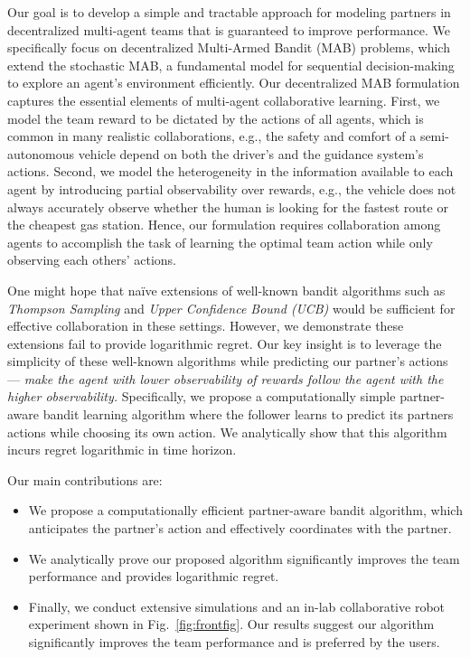\documentclass[letterpaper]{article} %
\theoremstyle{definition}
\begin{document}
Our goal is to develop a simple and tractable approach for modeling partners in decentralized multi-agent teams that is guaranteed to improve performance.
We specifically focus on decentralized Multi-Armed Bandit (MAB) problems, which extend the stochastic MAB, a fundamental model for sequential decision-making to explore an agent's environment efficiently.
Our decentralized MAB formulation captures the essential elements of multi-agent collaborative learning.
First, we model the team reward to be dictated by the actions of all agents, which is common in many realistic collaborations, e.g., the safety and comfort of a semi-autonomous vehicle depend on both the driver's and the guidance system's actions.
Second, we model the heterogeneity in the information available to each agent by introducing partial observability over rewards, e.g., the vehicle does not always accurately observe whether the human is looking for the fastest route or the cheapest gas station.
Hence, our formulation requires collaboration among agents to accomplish the task of learning the optimal team action while only observing each others' actions.

One might hope that na\"ive extensions of well-known bandit algorithms such as \emph{Thompson Sampling} and \emph{Upper Confidence Bound (UCB)} would be sufficient for effective collaboration in these settings. However, we demonstrate these extensions fail to provide logarithmic regret.
Our key insight is to leverage the simplicity of these well-known algorithms while predicting our partner's actions --- \emph{make the agent with lower observability of rewards follow the agent with the higher observability.} Specifically, we propose a computationally simple partner-aware bandit learning algorithm where the follower learns to predict its partners actions while choosing its own action.
We analytically show that this algorithm incurs regret logarithmic in time horizon.


Our main contributions are:
\begin{itemize}[leftmargin=20pt]
    \item We propose a computationally efficient partner-aware bandit algorithm, which anticipates the partner's action and effectively coordinates with the partner.

    \item We analytically prove our proposed algorithm significantly improves the team performance and provides logarithmic regret.

    \item Finally, we conduct extensive simulations and an in-lab collaborative robot experiment shown in Fig.~\ref{fig:frontfig}. Our results suggest our algorithm significantly improves the team performance and is preferred by the users.
\end{itemize}
\end{document}
